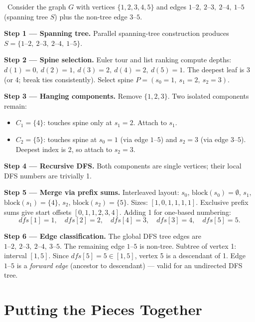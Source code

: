 \begin{ppexample}
\ Consider the graph \(G\) with vertices \(\{1,2,3,4,5\}\) and edges
\(1\text{--}2,\ 2\text{--}3,\ 2\text{--}4,\ 1\text{--}5\) (spanning tree \(S\)) plus the non-tree edge \(3\text{--}5\).

\textbf{Step 1 — Spanning tree.}
Parallel spanning-tree construction produces \(S = \{1\text{--}2,\ 2\text{--}3,\ 2\text{--}4,\ 1\text{--}5\}\).

\textbf{Step 2 — Spine selection.}
Euler tour and list ranking compute depths: \(d(1)=0,\ d(2)=1,\ d(3)=2,\ d(4)=2,\ d(5)=1\).
The deepest leaf is 3 (or 4; break ties consistently).
Select spine \(P = (s_0{=}1,\ s_1{=}2,\ s_2{=}3)\).

\textbf{Step 3 — Hanging components.}
Remove \(\{1,2,3\}\).  Two isolated components remain:
\begin{itemize}
    \item \(C_1 = \{4\}\): touches spine only at \(s_1{=}2\).  Attach to \(s_1\).
    \item \(C_2 = \{5\}\): touches spine at \(s_0{=}1\) (via edge \(1\text{--}5\)) and \(s_2{=}3\) (via edge \(3\text{--}5\)).
          Deepest index is 2, so attach to \(s_2{=}3\).
\end{itemize}

\textbf{Step 4 — Recursive DFS.}
Both components are single vertices; their local DFS numbers are trivially 1.

\textbf{Step 5 — Merge via prefix sums.}
Interleaved layout: \(s_0\), \(\text{block}(s_0){=}\emptyset\), \(s_1\), \(\text{block}(s_1){=}\{4\}\), \(s_2\), \(\text{block}(s_2){=}\{5\}\).
Sizes: \([1,0,1,1,1,1]\).  Exclusive prefix sums give start offsets \([0,1,1,2,3,4]\).
Adding 1 for one-based numbering:
\[
    dfs[1]=1,\quad dfs[2]=2,\quad dfs[4]=3,\quad dfs[3]=4,\quad dfs[5]=5.
\]

\textbf{Step 6 — Edge classification.}
The global DFS tree edges are \(1\text{--}2,\ 2\text{--}3,\ 2\text{--}4,\ 3\text{--}5\).
The remaining edge \(1\text{--}5\) is non-tree.
Subtree of vertex 1: interval \([1,5]\).  Since \(dfs[5]=5 \in [1,5]\), vertex 5 is a descendant of 1.
Edge \(1\text{--}5\) is a \emph{forward edge} (ancestor to descendant) --- valid for an undirected DFS tree.
\end{ppexample}

\section{Putting the Pieces Together}
\label{sec:lec26-putting-together}

